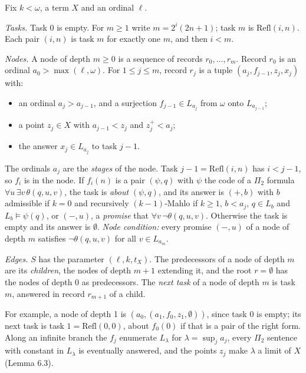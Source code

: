 \documentclass[11pt]{article}
\begin{document}
\begin{statement} Fix $k < \omega$, a term $X$ and an ordinal $\ell$.

\emph{Tasks.} Task $0$ is empty. For $m \ge 1$ write $m = 2^i(2n+1)$; task $m$ is $\mathrm{Refl}(i, n)$. Each pair $(i,
n)$ is task $m$ for exactly one $m$, and then $i < m$.

\emph{Nodes.} A node of depth $m \ge 0$ is a sequence of records $r_0, \dots, r_m$. Record $r_0$ is an ordinal $a_0 >
\max(\ell, \omega)$. For $1 \le j \le m$, record $r_j$ is a tuple $(a_j, f_{j-1}, z_j, x_j)$ with:
\begin{itemize}
\item an ordinal $a_j > a_{j-1}$, and a surjection $f_{j-1} \in L_{a_j}$ from $\omega$ onto $L_{a_{j-1}}$;
\item a point $z_j \in X$ with $a_{j-1} < z_j$ and $z_j^+ < a_j$;
\item the answer $x_j \in L_{a_j}$ to task $j-1$.
\end{itemize}
The ordinals $a_j$ are the \emph{stages} of the node. Task $j - 1 = \mathrm{Refl}(i,n)$ has $i < j - 1$, so $f_i$ is in
the node. If $f_i(n)$ is a pair $(\psi, q)$ with $\psi$ the code of a $\Pi_2$ formula $\forall u\, \exists v\,
\theta(q,u,v)$, the task is \emph{about} $(\psi, q)$, and its answer is $(+, b)$ with $b$ admissible if $k = 0$ and recursively $(k-1)$-Mahlo if $k \ge 1$, $b < a_j$, $q \in
L_b$ and $L_b \models \psi(q)$, or $(-, u)$, a \emph{promise} that $\forall v\, \neg\theta(q, u, v)$. Otherwise the
task is empty and its answer is $\emptyset$. \emph{Node condition:} every promise $(-, u)$ of a node of depth $m$
satisfies $\neg\theta(q, u, v)$ for all $v \in L_{a_m}$.

\emph{Edges.} $S$ has the parameter $(\ell, k, t_X)$. The predecessors of a node of depth $m$ are its \emph{children},
the nodes of depth $m+1$ extending it, and the root $r = \emptyset$ has the nodes of depth $0$ as predecessors. The
\emph{next task} of a node of depth $m$ is task $m$, answered in record $r_{m+1}$ of a child.
\end{statement}

For example, a node of depth 1 is $(a_0, (a_1, f_0, z_1, \emptyset))$, since task $0$ is empty; its next task is task
$1 = \mathrm{Refl}(0,0)$, about $f_0(0)$ if that is a pair of the right form. Along an infinite branch the $f_j$
enumerate $L_\lambda$ for $\lambda = \sup_j a_j$, every $\Pi_2$ sentence with constant in $L_\lambda$ is eventually
answered, and the points $z_j$ make $\lambda$ a limit of $X$ (Lemma 6.3).
\end{document}
